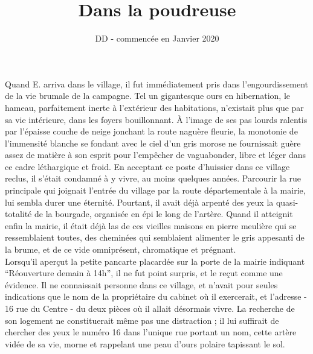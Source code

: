 \documentclass[french,amstex,12pt,a5paper]{book}
\begin{document}
\title{Dans la poudreuse}
\author{DD - commencée en Janvier 2020}
\maketitle

\tableofcontents

\chapter{}

Quand E. arriva dans le village, il fut immédiatement pris dans l'engourdissement de la vie brumale de la campagne. Tel un gigantesque ours en hibernation, le hameau, parfaitement inerte à l'extérieur des habitations, n'existait plus que par sa vie intérieure, dans les foyers bouillonnant. À l'image de ses pas lourds ralentis par l'épaisse couche de neige jonchant la route naguère fleurie, la monotonie de l'immensité blanche se fondant avec le ciel d'un gris morose ne fournissait guère assez de matière à son esprit pour l'empêcher de vaguabonder, libre et léger dans ce cadre léthargique et froid. En acceptant ce poste d'huissier dans ce village reclus, il s'était condamné à y vivre, au moins quelques années. Parcourir la rue principale qui joignait l'entrée du village par la route départementale à la mairie, lui sembla durer une éternité. Pourtant, il avait déjà arpenté des yeux la quasi-totalité de la bourgade, organisée en épi le long de l'artère. Quand il atteignit enfin la mairie, il était déjà las de ces vieilles maisons en pierre meulière qui se ressemblaient toutes, des cheminées qui semblaient alimenter le gris appesanti de la brume, et de ce vide omniprésent, chromatique et prégnant.\\

Lorsqu'il aperçut la petite pancarte placardée sur la porte de la mairie indiquant ``Réouverture demain à 14h'', il ne fut point surpris, et le reçut comme une évidence. Il ne connaissait personne dans ce village, et n'avait pour seules indications que le nom de la propriétaire du cabinet où il exercerait, et l'adresse - 16 rue du Centre - du deux pièces où il allait désormais vivre. La recherche de son logement ne constituerait même pas une distraction ; il lui suffirait de chercher des yeux le numéro 16 dans l'unique rue portant un nom, cette artère vidée de sa vie, morne et rappelant une peau d'ours polaire tapissant le sol.\\
\end{document}
